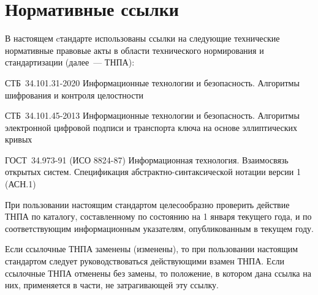 \chapter{Нормативные ссылки}

В настоящем cтандарте использованы ссылки на следующие 
технические нормативные правовые акты в области 
технического нормирования и стандартизации (далее~--- ТНПА):

СТБ~34.101.31-2020 Информационные технологии и безопасность. 
Алгоритмы шифрования и контроля целостности

СТБ~34.101.45-2013 Информационные технологии и безопасность. 
Алгоритмы электронной цифровой подписи и транспорта ключа на основе
эллиптических кривых

ГОСТ~34.973-91 (ИСО 8824-87) Информационная технология. Взаимосвязь
открытых систем. Спецификация абстрактно-синтаксической нотации
версии 1 (АСН.1)

\begin{note*}
При пользовании настоящим стандартом целесообразно проверить
действие ТНПА по каталогу, составленному по состоянию на 1 января текущего года,
и по соответствующим информационным указателям, опубликованным в текущем году.

Если ссылочные ТНПА заменены (изменены), то при пользовании настоящим стандартом
следует руководствоваться действующими взамен ТНПА. Если ссылочные ТНПА
отменены без замены, то положение, в котором дана ссылка на них, применяется в
части, не затрагивающей эту ссылку.
\end{note*}

